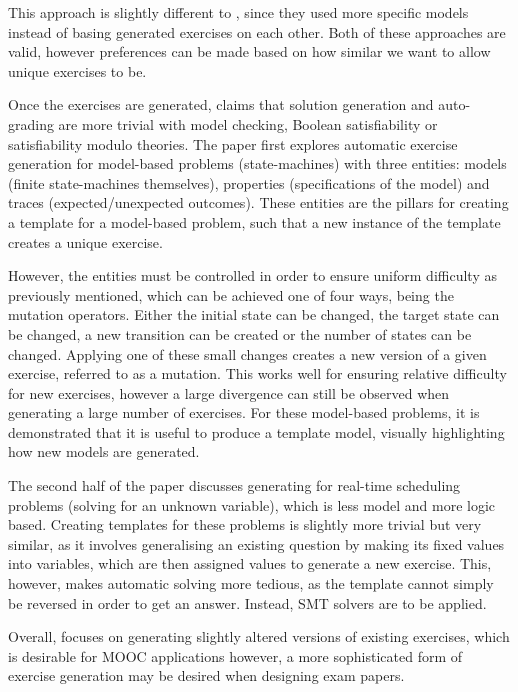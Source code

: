 \documentclass{l4proj}
\begin{document}
This approach is slightly different to \citet{Hoz21}, since they used more specific models instead of basing generated exercises on each other. Both of these approaches are valid, however preferences can be made based on how similar we want to allow unique exercises to be. 

Once the exercises are generated, \citet{Sad12} claims that solution generation and auto-grading are more trivial with model checking, Boolean satisfiability or satisfiability modulo theories. The paper first explores automatic exercise generation for model-based problems (state-machines) with three entities: models (finite state-machines themselves), properties (specifications of the model) and traces (expected/unexpected outcomes). These entities are the pillars for creating a template for a model-based problem, such that a new instance of the template creates a unique exercise. 

However, the entities must be controlled in order to ensure uniform difficulty as previously mentioned, which can be achieved one of four ways, being the mutation operators. Either the initial state can be changed, the target state can be changed, a new transition can be created or the number of states can be changed. Applying one of these small changes creates a new version of a given exercise, referred to as a mutation. This works well for ensuring relative difficulty for new exercises, however a large divergence can still be observed when generating a large number of exercises. For these model-based problems, it is demonstrated that it is useful to produce a template model, visually highlighting how new models are generated. 

The second half of the paper discusses generating for real-time scheduling problems (solving for an unknown variable), which is less model and more logic based. Creating templates for these problems is slightly more trivial but very similar, as it involves generalising an existing question by making its fixed values into variables, which are then assigned values to generate a new exercise. This, however, makes automatic solving more tedious, as the template cannot simply be reversed in order to get an answer. Instead, SMT solvers are to be applied.
 
Overall, \citet{Sad12} focuses on generating slightly altered versions of existing exercises, which is desirable for MOOC applications however, a more sophisticated form of exercise generation may be desired when designing exam papers.
\end{document}

